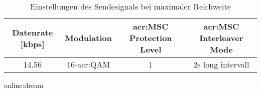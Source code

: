 \begin{table}[h]
	\begin{center}
		\begin{tabular}{cccc}
			\toprule
			\textbf{Datenrate [kbps]} & \textbf{Modulation}& \textbf{\gls{acr:MSC} Protection Level} & \textbf{\gls{acr:MSC} Interleaver Mode}\\
			\midrule
			
			14.56 &16-\gls{acr:QAM} & 1 & 2s long intervall\\
		
			\bottomrule
		\end{tabular}
		\caption{Einstellungen des Sendesignals bei maximaler Reichweite}\gls{online:dream}
		\label{tab:drmmax}
	\end{center}
\end{table}


 